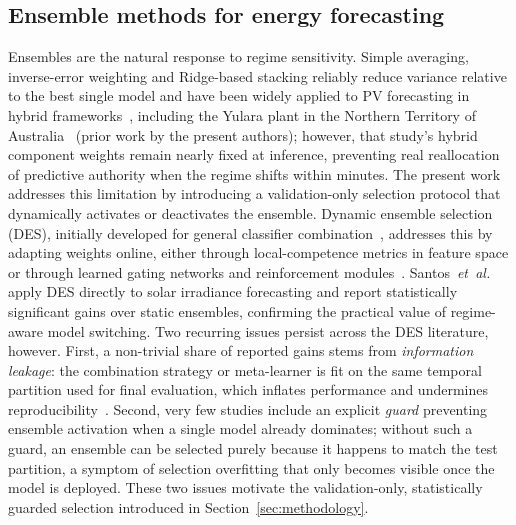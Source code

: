 \subsection{Ensemble methods for energy forecasting}
\label{subsec:rw_ensemble}

Ensembles are the natural response to regime sensitivity. Simple
averaging, inverse-error weighting and Ridge-based stacking reliably
reduce variance relative to the best single model and have been widely
applied to PV forecasting in hybrid
frameworks~\cite{cisse2026optimized,hou2024ref,perera2024regional,abumohsen2024combining},
including the Yulara plant in the Northern Territory of
Australia~\cite{cisse2026optimized} (prior work by the present
authors); however, that study's hybrid component weights remain nearly
fixed at inference, preventing real reallocation of predictive
authority when the regime shifts within minutes. The present work
addresses this limitation by introducing a validation-only selection
protocol that dynamically activates or deactivates the ensemble. Dynamic
ensemble selection (DES), initially developed for general classifier
combination~\cite{cruz2018dynamic}, addresses this by adapting weights
online, either through local-competence metrics in feature space or
through learned gating networks and reinforcement
modules~\cite{zhang2024interpretable,song2025dynamic,achouri2026dynamic,konduru2025irradiance}.
Santos~\textit{et~al.}~\cite{santos2022irradiance} apply DES directly
to solar irradiance forecasting and report statistically significant
gains over static ensembles, confirming the practical value of
regime-aware model switching. Two recurring issues persist across the
DES literature, however. First, a non-trivial share of reported gains
stems from \emph{information leakage}: the combination strategy or
meta-learner is fit on the same temporal partition used for final
evaluation, which inflates performance and undermines
reproducibility~\cite{kaufman2012leakage,kapoor2023leakage}. Second,
very few studies include an explicit \emph{guard} preventing ensemble
activation when a single model already dominates; without such a
guard, an ensemble can be selected purely because it happens to match
the test partition, a symptom of selection overfitting that only
becomes visible once the model is deployed. These two issues motivate
the validation-only, statistically guarded selection introduced in
Section~\ref{sec:methodology}.

